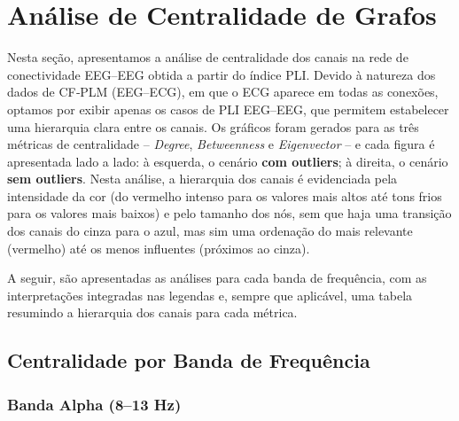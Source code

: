 \chapter{Análise de Centralidade de Grafos}

Nesta seção, apresentamos a análise de centralidade dos canais na rede de conectividade EEG–EEG obtida a partir do índice PLI. Devido à natureza dos dados de CF‐PLM (EEG–ECG), em que o ECG aparece em todas as conexões, optamos por exibir apenas os casos de PLI EEG–EEG, que permitem estabelecer uma hierarquia clara entre os canais. Os gráficos foram gerados para as três métricas de centralidade – \textit{Degree}, \textit{Betweenness} e \textit{Eigenvector} – e cada figura é apresentada lado a lado: à esquerda, o cenário \textbf{com outliers}; à direita, o cenário \textbf{sem outliers}. Nesta análise, a hierarquia dos canais é evidenciada pela intensidade da cor (do vermelho intenso para os valores mais altos até tons frios para os valores mais baixos) e pelo tamanho dos nós, sem que haja uma transição dos canais do cinza para o azul, mas sim uma ordenação do mais relevante (vermelho) até os menos influentes (próximos ao cinza).

A seguir, são apresentadas as análises para cada banda de frequência, com as interpretações integradas nas legendas e, sempre que aplicável, uma tabela resumindo a hierarquia dos canais para cada métrica.

\section{Centralidade por Banda de Frequência}

\subsection{Banda Alpha (8--13 Hz)}

